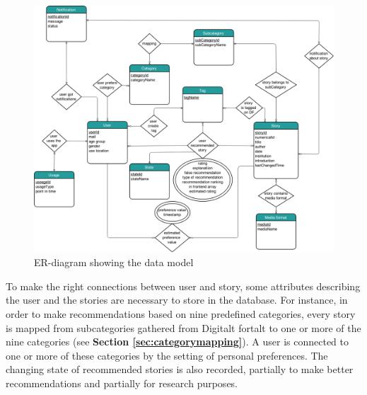 \begin{figure}[h!]
	\centering
	\includegraphics[width=\textwidth]{fig/er_diagram}
	\caption{ER-diagram showing the data model}
	\label{Fig:er_diagram}
\end{figure}

To make the right connections between user and story, some attributes describing the user and the stories are necessary to store in the database. For instance, in order to make recommendations based on nine predefined categories, every story is mapped from subcategories gathered from Digitalt fortalt to one or more of the nine categories (see \textbf{Section \ref{sec:categorymapping}}). A user is connected to one or more of these categories by the setting of personal preferences. The changing state of recommended stories is also recorded, partially to make better recommendations and partially for research purposes. \newline

